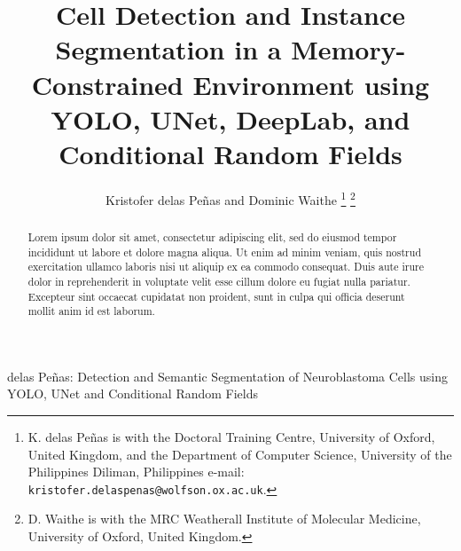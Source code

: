 \documentclass[journal]{IEEEtran}
\begin{document}
%
\title{Cell Detection and Instance Segmentation in a Memory-Constrained Environment using YOLO, UNet, DeepLab, and Conditional Random Fields}

\author{Kristofer delas Pe\~nas and
        Dominic Waithe%
\thanks{K. delas Pe\~nas is with the Doctoral Training Centre, University of Oxford, United Kingdom, and the Department of Computer Science, University of the Philippines Diliman, Philippines e-mail: \texttt{kristofer.delaspenas@wolfson.ox.ac.uk}.}%
\thanks{D. Waithe is with the MRC Weatherall Institute of Molecular Medicine, University of Oxford, United Kingdom.}}%

%
{delas Pe\~nas: Detection and Semantic Segmentation of Neuroblastoma Cells using YOLO, UNet and Conditional Random Fields}
% 











\maketitle

\begin{abstract}
Lorem ipsum dolor sit amet, consectetur adipiscing elit, sed do eiusmod tempor incididunt ut labore et dolore magna aliqua. Ut enim ad minim veniam, quis nostrud exercitation ullamco laboris nisi ut aliquip ex ea commodo consequat. Duis aute irure dolor in reprehenderit in voluptate velit esse cillum dolore eu fugiat nulla pariatur. Excepteur sint occaecat cupidatat non proident, sunt in culpa qui officia deserunt mollit anim id est laborum.
\end{abstract}
\end{document}
